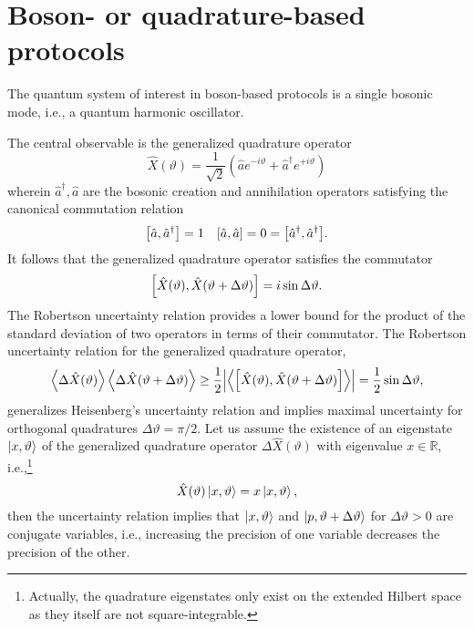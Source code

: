 \section{Boson- or quadrature-based protocols}

The quantum system of interest in boson-based protocols is a single bosonic mode, i.e., a quantum harmonic oscillator.

The central observable is the generalized quadrature operator~\cite[p.~36]{Barnett2002}
\begin{equation}
	\hat{X}(\vartheta)
	=
	\frac{1}{\sqrt{2}}
	\left(
		\hat{a}
		e^{-i\vartheta}
		+
		\hat{a}^\dagger
		e^{+i\vartheta}
	\right)
\end{equation}
wherein $\hat{a}^\dagger,\hat{a}$ are the bosonic creation and annihilation operators satisfying the canonical commutation relation
\begin{align}
	\comm{\hat{a}}{\hat{a}^\dagger}
	=
	1
	&&
	\comm{\hat{a}}{\hat{a}}
	=
	0
	=
	\comm{\hat{a}^\dagger}{\hat{a}^\dagger}
	.
\end{align}
It follows that the generalized quadrature operator satisfies the commutator
\begin{equation}
	\comm{\hat{X}(\vartheta)}{\hat{X}(\vartheta+\Delta\vartheta)}
	=
	i\sin\Delta\vartheta
	.
\end{equation}
The Robertson uncertainty relation provides a lower bound for the product of the standard deviation of two operators in terms of their commutator.
The Robertson uncertainty relation for the generalized quadrature operator,
\begin{equation}
	\expval{\Delta\hat{X}(\vartheta)}
	\expval{\Delta\hat{X}(\vartheta+\Delta\vartheta)}
	\geq
	\frac{1}{2}
	\abs{\expval{\comm{\hat{X}(\vartheta)}{\hat{X}(\vartheta+\Delta\vartheta)}}}
	=
	\frac{1}{2}
	\sin\Delta\vartheta
	,
\end{equation}
generalizes Heisenberg's uncertainty relation and implies maximal uncertainty for orthogonal quadratures $\Delta\vartheta=\pi/2$.
Let us assume the existence of an eigenstate $\ket{x,\vartheta}$ of the generalized quadrature operator $\Delta\hat{X}(\vartheta)$ with eigenvalue $x\in\mathbb{R}$, i.e.,\footnote{Actually, the quadrature eigenstates only exist on the extended Hilbert space as they itself are not square-integrable.}
\begin{equation}
	\hat{X}(\vartheta)
	\ket{x,\vartheta}
	=
	x\ket{x,\vartheta}
	,
\end{equation}
then the uncertainty relation implies that $\ket{x,\vartheta}$ and $\ket{p,\vartheta+\Delta\vartheta}$ for $\Delta\vartheta>0$ are conjugate variables, i.e., increasing the precision of one variable decreases the precision of the other.
